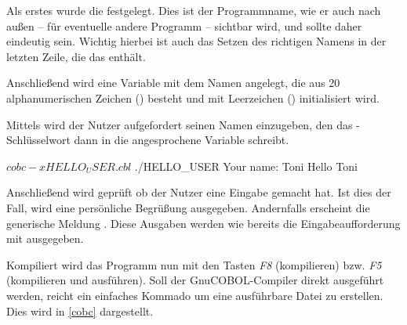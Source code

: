 Als erstes wurde die  festgelegt. Dies ist der Programmname, wie er auch nach außen -- für eventuelle andere Programm -- sichtbar wird, und sollte daher eindeutig sein. Wichtig hierbei ist auch das Setzen des richtigen Namens in der letzten Zeile, die das  enthält.

Anschließend wird eine Variable mit dem Namen  angelegt, die aus 20 alphanumerischen Zeichen () besteht und mit Leerzeichen () initialisiert wird.

Mittels  wird der Nutzer aufgefordert seinen Namen einzugeben, den das -Schlüsselwort dann in die angesprochene Variable schreibt.

\begin{shellwindow}
$ cobc -x HELLO_USER.cbl
$ ./HELLO_USER
Your name: Toni
Hello Toni
\end{shellwindow}

Anschließend wird geprüft ob der Nutzer eine Eingabe gemacht hat. Ist dies der Fall, wird eine persönliche Begrüßung ausgegeben. Andernfalls erscheint die generische Meldung . Diese Ausgaben werden wie bereits die Eingabeaufforderung mit  ausgegeben.

Kompiliert wird das Programm nun mit den Tasten \textit{F8} (kompilieren) bzw. \textit{F5} (kompilieren und ausführen). Soll der GnuCOBOL-Compiler direkt ausgeführt werden, reicht ein einfaches Kommado um eine ausführbare Datei zu erstellen. Dies wird in \autoref{cobc} dargestellt.